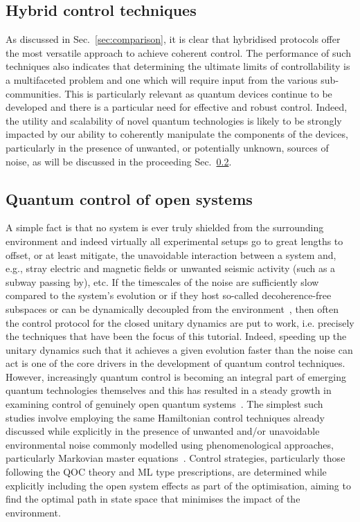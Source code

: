 \subsection{Hybrid control techniques}
As discussed in Sec.~\ref{sec:comparison}, it is clear that hybridised protocols offer the most versatile approach to achieve coherent control. The performance of such techniques also indicates that determining the ultimate limits of controllability is a multifaceted problem and one which will require input from the various sub-communities. This is particularly relevant as quantum devices continue to be developed and there is a particular need for effective and robust control. Indeed, the utility and scalability of novel quantum technologies is likely to be strongly impacted by our ability to coherently manipulate the components of the devices, particularly in the presence of unwanted, or potentially unknown, sources of noise, as will be discussed in the proceeding Sec.~\ref{outlook_sec_opensystems}.

\subsection{Quantum control of open systems} \label{outlook_sec_opensystems}
A simple fact is that no system is ever truly shielded from the surrounding environment and indeed virtually all experimental setups go to great lengths to offset, or at least mitigate, the unavoidable interaction between a system and, e.g., stray electric and magnetic fields or unwanted seismic activity (such as a subway passing by), etc. If the timescales of the noise are sufficiently slow compared to the system's evolution or if they host so-called decoherence-free subspaces or can be dynamically decoupled from the environment~\cite{DFSreview}, then often the control protocol for the closed unitary dynamics are put to work, i.e. precisely the techniques that have been the focus of this tutorial. Indeed, speeding up the unitary dynamics such that it achieves a given evolution faster than the noise can act is one of the core drivers in the development of quantum control techniques. However, increasingly quantum control is becoming an integral part of emerging quantum technologies themselves and this has resulted in a steady growth in examining control of genuinely open quantum systems~\cite{Koch2016OpenSys}. The simplest such studies involve employing the same Hamiltonian control techniques already discussed while explicitly in the presence of unwanted and/or unavoidable environmental noise commonly modelled using phenomenological approaches, particularly Markovian master equations~\cite{Koch2016OpenSys}. Control strategies, particularly those following the QOC theory and ML type prescriptions, are determined while explicitly including the open system effects as part of the optimisation, aiming to find the optimal path in state space that minimises the impact of the environment.

